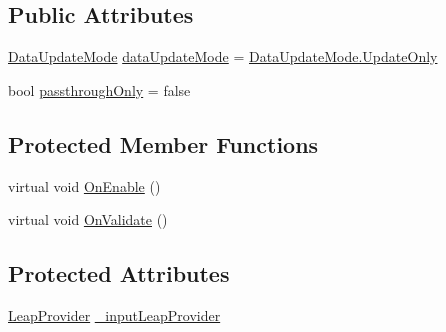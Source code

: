 \subsection*{Public Attributes}
\begin{DoxyCompactItemize}
\item 
\mbox{\hyperlink{class_leap_1_1_unity_1_1_post_process_provider_a00f92d69e8bdf46e32c5e8eda793e6c3}{Data\+Update\+Mode}} \mbox{\hyperlink{class_leap_1_1_unity_1_1_post_process_provider_a75af54a8ccf66c83f48a34e6394ff711}{data\+Update\+Mode}} = \mbox{\hyperlink{class_leap_1_1_unity_1_1_post_process_provider_a00f92d69e8bdf46e32c5e8eda793e6c3a350c1257b699a10fa9f512f6e3b3a4fd}{Data\+Update\+Mode.\+Update\+Only}}
\item 
bool \mbox{\hyperlink{class_leap_1_1_unity_1_1_post_process_provider_af6f150ec87c1e03da652e202179eea88}{passthrough\+Only}} = false
\end{DoxyCompactItemize}
\subsection*{Protected Member Functions}
\begin{DoxyCompactItemize}
\item 
virtual void \mbox{\hyperlink{class_leap_1_1_unity_1_1_post_process_provider_a1bab072df44cc4badd3dd350445bcb71}{On\+Enable}} ()
\item 
virtual void \mbox{\hyperlink{class_leap_1_1_unity_1_1_post_process_provider_a1ca33dd982907638e34a1c126460e689}{On\+Validate}} ()
\end{DoxyCompactItemize}
\subsection*{Protected Attributes}
\begin{DoxyCompactItemize}
\item 
\mbox{\hyperlink{class_leap_1_1_unity_1_1_leap_provider}{Leap\+Provider}} \mbox{\hyperlink{class_leap_1_1_unity_1_1_post_process_provider_a72c564c19b906ee5c28a7c35765b515f}{\+\_\+input\+Leap\+Provider}}
\end{DoxyCompactItemize}
